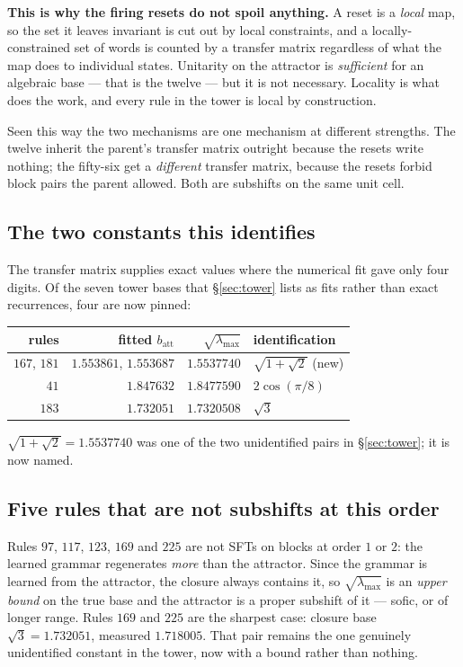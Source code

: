 \documentclass[11pt]{article}
\newcommand{\att}{\mathrm{att}}
\begin{document}
\noindent \textbf{This is why the firing resets do not spoil anything.} A reset
is a \emph{local} map, so the set it leaves invariant is cut out by local
constraints, and a locally-constrained set of words is counted by a transfer
matrix regardless of what the map does to individual states. Unitarity on the
attractor is \emph{sufficient} for an algebraic base --- that is the twelve ---
but it is not necessary. Locality is what does the work, and every rule in the
tower is local by construction.

Seen this way the two mechanisms are one mechanism at different strengths. The
twelve inherit the parent's transfer matrix outright because the resets write
nothing; the fifty-six get a \emph{different} transfer matrix, because the
resets forbid block pairs the parent allowed. Both are subshifts on the same
unit cell.

\subsection{The two constants this identifies}

The transfer matrix supplies exact values where the numerical fit gave only four
digits. Of the seven tower bases that \S\ref{sec:tower} lists as fits rather
than exact recurrences, four are now pinned:

\begin{center}\small
\begin{tabular}{rrrl}
\toprule
rules & fitted $b_\att$ & $\sqrt{\lambda_{\max}}$ & identification \\
\midrule
$167$, $181$ & $1.553861$, $1.553687$ & $1.5537740$ & $\sqrt{1+\sqrt2}$ \quad(new) \\
$41$ & $1.847632$ & $1.8477590$ & $2\cos(\pi/8)$ \\
$183$ & $1.732051$ & $1.7320508$ & $\sqrt3$ \\
\bottomrule
\end{tabular}
\end{center}

\noindent $\sqrt{1+\sqrt2}=1.5537740$ was one of the two unidentified pairs in
\S\ref{sec:tower}; it is now named.

\subsection{Five rules that are not subshifts at this order}

Rules $97$, $117$, $123$, $169$ and $225$ are not SFTs on blocks at order $1$ or
$2$: the learned grammar regenerates \emph{more} than the attractor. Since the
grammar is learned from the attractor, the closure always contains it, so
$\sqrt{\lambda_{\max}}$ is an \emph{upper bound} on the true base and the
attractor is a proper subshift of it --- sofic, or of longer range. Rules $169$
and $225$ are the sharpest case: closure base $\sqrt3=1.732051$, measured
$1.718005$. That pair remains the one genuinely unidentified constant in the
tower, now with a bound rather than nothing.
\end{document}
